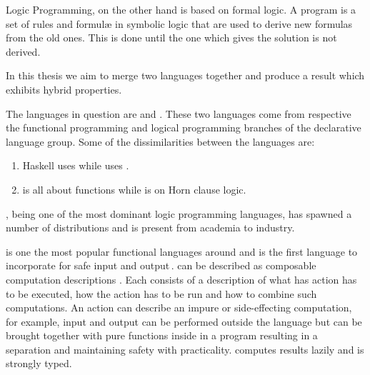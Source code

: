 \documentclass[thesis-solanki.tex]{subfiles}
\begin{document}
Logic Programming, \cite{spivey1995introduction} on the other hand is based on formal logic.
A program is a set of rules and formul\ae{} in symbolic logic that are used to derive new formulas from the old
ones.
This is done until the one which gives the solution is not derived.


In this thesis we aim to merge two languages
together and produce a result which exhibits hybrid
properties.

The languages in question are  and . These two languages come from respective the functional programming and logical programming branches of the
    declarative language group.
Some of the dissimilarities between the languages are:
\begin{enumerate}
\item { Haskell} uses  while  uses .

\item {} is all about functions while  is on Horn clause logic.
\end{enumerate} 

 \cite{wikiprolog}, being one of the most dominant logic programming
languages, has  
spawned a number of distributions and is present from academia to industry.  

 is one the most popular \cite{website:langpop} functional languages around and is the 
first language to incorporate  \cite{wadler1992comprehending} for safe input and output\,.  can be 
described as composable computation descriptions \cite{website:monadshaskellorg} . Each  consists of a 
description of what has action has to be executed, how the action has to be run and how to combine such 
computations. An action can describe an impure or side-effecting computation, for example, input and output can be 
performed outside the language but can be brought together with pure functions inside in a program resulting in a 
separation and maintaining safety with practicality.  computes results lazily and is strongly 
typed. 
\end{document}
